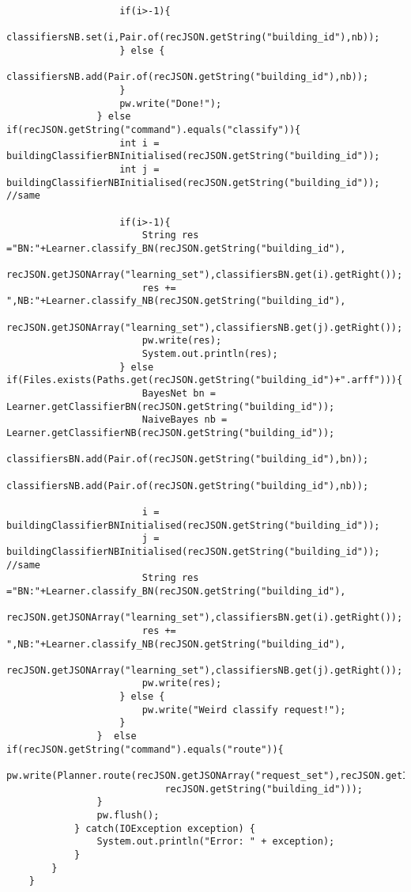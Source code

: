 \begin{lstlisting}
                    if(i>-1){
                        classifiersNB.set(i,Pair.of(recJSON.getString("building_id"),nb));
                    } else {
                        classifiersNB.add(Pair.of(recJSON.getString("building_id"),nb));
                    }
                    pw.write("Done!");
                } else if(recJSON.getString("command").equals("classify")){
                    int i = buildingClassifierBNInitialised(recJSON.getString("building_id"));
                    int j = buildingClassifierNBInitialised(recJSON.getString("building_id")); //same

                    if(i>-1){
                        String res ="BN:"+Learner.classify_BN(recJSON.getString("building_id"),
                                recJSON.getJSONArray("learning_set"),classifiersBN.get(i).getRight());
                        res += ",NB:"+Learner.classify_NB(recJSON.getString("building_id"),
                                recJSON.getJSONArray("learning_set"),classifiersNB.get(j).getRight());
                        pw.write(res);
                        System.out.println(res);
                    } else if(Files.exists(Paths.get(recJSON.getString("building_id")+".arff"))){
                        BayesNet bn = Learner.getClassifierBN(recJSON.getString("building_id"));
                        NaiveBayes nb = Learner.getClassifierNB(recJSON.getString("building_id"));
                        classifiersBN.add(Pair.of(recJSON.getString("building_id"),bn));
                        classifiersNB.add(Pair.of(recJSON.getString("building_id"),nb));

                        i = buildingClassifierBNInitialised(recJSON.getString("building_id"));
                        j = buildingClassifierNBInitialised(recJSON.getString("building_id")); //same
                        String res ="BN:"+Learner.classify_BN(recJSON.getString("building_id"),
                                recJSON.getJSONArray("learning_set"),classifiersBN.get(i).getRight());
                        res += ",NB:"+Learner.classify_NB(recJSON.getString("building_id"),
                                recJSON.getJSONArray("learning_set"),classifiersNB.get(j).getRight());
                        pw.write(res);
                    } else {
                        pw.write("Weird classify request!");
                    }
                }  else if(recJSON.getString("command").equals("route")){
                    pw.write(Planner.route(recJSON.getJSONArray("request_set"),recJSON.getInt("deadline"),
                            recJSON.getString("building_id")));
                }
                pw.flush();
            } catch(IOException exception) {
                System.out.println("Error: " + exception);
            }
        }
    }


\end{lstlisting}
